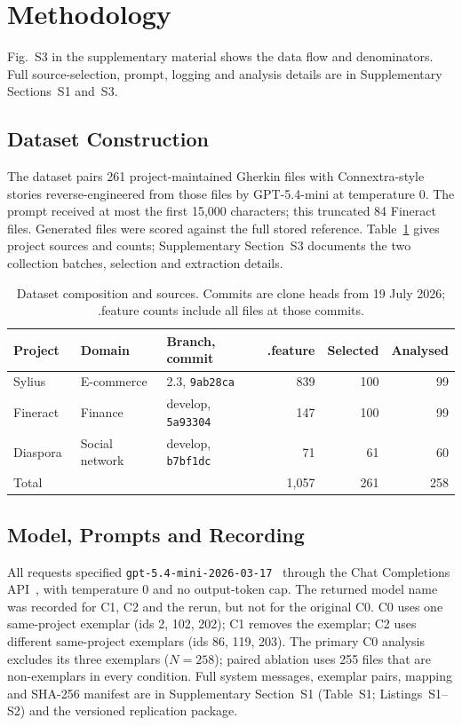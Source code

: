 \section{Methodology}
\label{sec:method}

Fig.~S3 in the supplementary material shows the data flow and denominators. Full source-selection, prompt, logging and analysis details are in Supplementary Sections~S1 and~S3.

\subsection{Dataset Construction}

The dataset pairs 261 project-maintained Gherkin files with Connextra-style stories reverse-engineered from those files by GPT-5.4-mini at temperature 0. The prompt received at most the first 15,000 characters; this truncated 84 Fineract files. Generated files were scored against the full stored reference. Table~\ref{tab:dataset} gives project sources and counts; Supplementary Section~S3 documents the two collection batches, selection and extraction details.

\begin{table}[!htbp]
\centering
\caption{Dataset composition and sources. Commits are clone heads from 19 July 2026; .feature counts include all files at those commits.}
\label{tab:dataset}
\setlength{\tabcolsep}{4pt}
\begin{tabular}{lllrrr}
\hline
Project & Domain & Branch, commit & .feature & Selected & Analysed\\
\hline
Sylius~\cite{sylius_repo} & E-commerce & 2.3, \texttt{9ab28ca} & 839 & 100 & 99\\
Fineract~\cite{fineract_repo} & Finance & develop, \texttt{5a93304} & 147 & 100 & 99\\
Diaspora~\cite{diaspora_repo} & Social network & develop, \texttt{b7bf1dc} & 71 & 61 & 60\\
\hline
Total & & & 1,057 & 261 & 258\\
\hline
\end{tabular}
\end{table}

\subsection{Model, Prompts and Recording}

All requests specified \texttt{gpt-5.4-mini-2026-03-17}~\cite{openai_gpt54mini} through the Chat Completions API~\cite{openai_chat_api}, with temperature 0 and no output-token cap. The returned model name was recorded for C1, C2 and the rerun, but not for the original C0. C0 uses one same-project exemplar (ids 2, 102, 202); C1 removes the exemplar; C2 uses different same-project exemplars (ids 86, 119, 203). The primary C0 analysis excludes its three exemplars ($N=258$); paired ablation uses 255 files that are non-exemplars in every condition. Full system messages, exemplar pairs, mapping and SHA-256 manifest are in Supplementary Section~S1 (Table~S1; Listings~S1--S2) and the versioned replication package.

